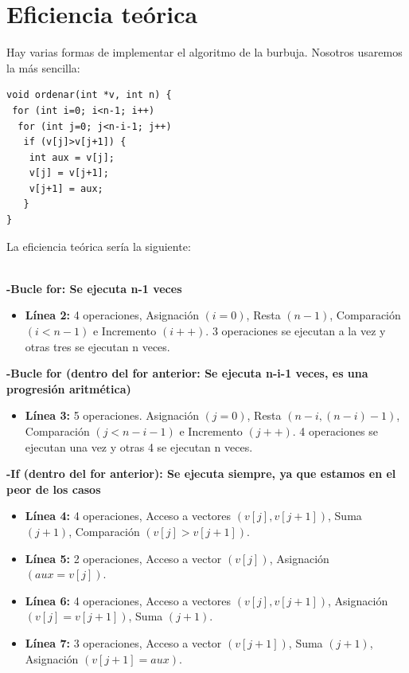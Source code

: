 \documentclass[a4paper,11pt]{article}
\begin{document}
\section{Eficiencia teórica}
Hay varias formas de implementar el algoritmo de la burbuja. Nosotros usaremos la más sencilla:
\newpage
\lstset{language=C, breaklines=true, basicstyle=\footnotesize}
\begin{lstlisting}[frame=single]
void ordenar(int *v, int n) {
 for (int i=0; i<n-1; i++)
  for (int j=0; j<n-i-1; j++)
   if (v[j]>v[j+1]) {
    int aux = v[j];
    v[j] = v[j+1];
    v[j+1] = aux;
   }
}
\end{lstlisting}
La eficiencia teórica sería la siguiente:\\ \\
\begin{large}
{\bf -Bucle for: Se ejecuta n-1 veces}
\end{large}
\begin{itemize}
\item {\bf Línea 2:} 4 operaciones, Asignación $(i=0)$, Resta $(n-1)$, Comparación $(i<n-1)$ e Incremento $(i++)$. 3 operaciones se ejecutan a la vez y otras tres se ejecutan n veces.
\end{itemize}
\begin{large}
{\bf -Bucle for (dentro del for anterior: Se ejecuta n-i-1 veces, es una progresión aritmética)}
\end{large}
\begin{itemize}
\item {\bf Línea 3:} 5 operaciones. Asignación $(j=0)$, Resta $(n-i,(n-i)-1)$, Comparación $(j<n-i-1)$ e Incremento $(j++)$. 4 operaciones se ejecutan una vez y otras 4 se ejecutan n veces.
\end{itemize}
\begin{large}
{\bf -If (dentro del for anterior): Se ejecuta siempre, ya que estamos en el peor de los casos}
\end{large}
\begin{itemize}
\item {\bf Línea 4:} 4 operaciones, Acceso a vectores $(v[j],v[j+1])$, Suma $(j+1)$, Comparación $(v[j]>v[j+1])$.
\item {\bf Línea 5:} 2 operaciones, Acceso a vector $(v[j])$, Asignación $(aux=v[j])$.
\item {\bf Línea 6:} 4 operaciones, Acceso a vectores $(v[j],v[j+1])$, Asignación $(v[j]=v[j+1])$, Suma $(j+1)$.
\item {\bf Línea 7:} 3 operaciones, Acceso a vector $(v[j+1])$, Suma $(j+1)$, Asignación $(v[j+1]=aux)$. 
\end{itemize}
\end{document}
